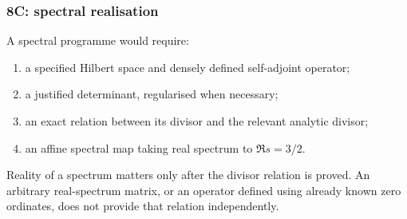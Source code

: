 \subsubsection{8C: spectral realisation}
\label{subsubsec:a12-spectral}
A spectral programme would require:
\begin{enumerate}[label=(\roman*)]
\item a specified Hilbert space and densely defined self-adjoint operator;
\item a justified determinant, regularised when necessary;
\item an exact relation between its divisor and the relevant analytic divisor;
\item an affine spectral map taking real spectrum to $\Re s=3/2$.
\end{enumerate}
Reality of a spectrum matters only after the divisor relation is proved.
An arbitrary real-spectrum matrix, or an operator defined using already
known zero ordinates, does not provide that relation independently.

